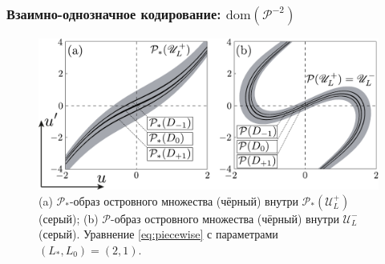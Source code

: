 \documentclass [10pt] {beamer}
\begin{document}
\begin{frame}
	\frametitle{Взаимно-однозначное кодирование: $\mathrm{dom}(\mathcal{P}^{-2})$}
	
	\begin{figure}
	\includegraphics[width = 1\textwidth]{pic/Poincare map of islands for piecewise equation.pdf}
	\caption{
		(a) $\mathcal{P}_*$-образ островного множества (чёрный) внутри $\mathcal{P}_*(\mathscr{U}_L^+)$ (серый); (b) $\mathcal{P}$-образ островного множества (чёрный) внутри $\mathscr{U}_L^-$ (серый).
		Уравнение \eqref{eq:piecewise} с параметрами $(L_*, L_0) = (2, 1)$.
	}
	\end{figure}
\end{frame}
\end{document}
